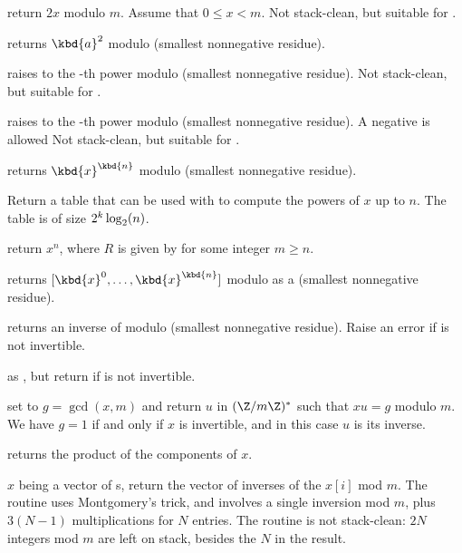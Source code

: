  return $2x$ modulo $m$. Assume that $0
\leq x < m$. Not stack-clean, but suitable for .

 returns $\kbd{a}^2$ modulo  (smallest
nonnegative residue).

 raises  to the -th
power modulo  (smallest nonnegative residue). Not stack-clean, but
suitable for .

 raises  to the -th
power modulo  (smallest nonnegative residue). A negative  is
allowed Not stack-clean, but suitable for .

 returns $\kbd{x}^\kbd{n}$
modulo  (smallest nonnegative residue).

Return a table  that can be used with
 to compute the powers of $x$ up to $n$.
The table is of size $2^k\*\log_2(n)$.

return $x^n$, where $R$ is given by 
for some integer $m\geq n$.

 returns
$[\kbd{x}^0, \dots, \kbd{x}^\kbd{n}]$ modulo  as a 
 (smallest nonnegative residue).

 returns an inverse of  modulo 
(smallest nonnegative residue). Raise an error if  is not invertible.

 as , but return
 if  is not invertible.

 set  to
$g = \gcd(x,m)$ and return $u$ in $(\Z/m\Z)^*$ such that $x u = g$ modulo $m$.
We have $g = 1$ if and only if $x$ is invertible, and in this case $u$
is its inverse.

 returns the product of the components of
$x$.

 $x$ being a vector of s, return
the vector of inverses of the $x[i]$ mod $m$. The routine uses Montgomery's
trick, and involves a single inversion mod $m$, plus $3(N-1)$ multiplications
for $N$ entries. The routine is not stack-clean: $2N$ integers mod $m$
are left on stack, besides the $N$ in the result.

